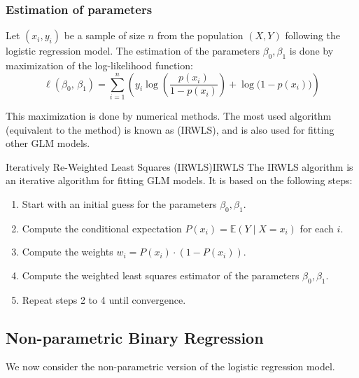 \subsubsection{Estimation of parameters}
Let $(x_i, y_i)$ be a sample of size $n$ from the population $(X, Y)$ following
the logistic regression model. The estimation of the parameters $\beta_0, \beta_1$
is done by maximization of the log-likelihood function:
\begin{equation*}
    \ell(\beta_0,\, \beta_1) = \sum_{i=1}^n \left(y_i \log \left( \frac{p(x_i)}{1 - p(x_i)} \right) + \log\bigl(1 - p(x_i)\bigr) \right)
\end{equation*}

This maximization is done by numerical methods. The most used algorithm
(equivalent to the  method)
is known as  (IRWLS), and
is also used for fitting other GLM models.

\begin{definition}{Iteratively Re-Weighted Least Squares (IRWLS)}{IRWLS}
    The IRWLS algorithm is an iterative algorithm for fitting GLM models.
    It is based on the following steps:
    \begin{enumerate}
        \item Start with an initial guess for the parameters $\beta_0, \beta_1$.
        \item Compute the conditional expectation $P(x_i) = \mathds{E}(Y \mid X = x_i)$
            for each $i$.
        \item Compute the weights $w_i = P(x_i) \cdot (1 - P(x_i))$.
        \item Compute the weighted least squares estimator of the parameters
            $\beta_0, \beta_1$.
        \item Repeat steps 2 to 4 until convergence.
    \end{enumerate}
\end{definition}

\subsection{Non-parametric Binary Regression}
We now consider the non-parametric version of the logistic regression model.

